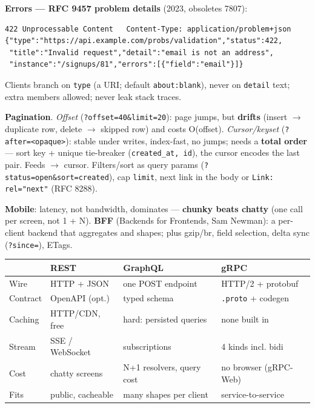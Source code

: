 \documentclass[8pt]{extarticle}
\begin{document}
\begin{multicols}{2}
\textbf{Errors — RFC 9457 problem details} (2023, obsoletes 7807):
\begin{lstlisting}
422 Unprocessable Content   Content-Type: application/problem+json
{"type":"https://api.example.com/probs/validation","status":422,
 "title":"Invalid request","detail":"email is not an address",
 "instance":"/signups/81","errors":[{"field":"email"}]}
\end{lstlisting}
Clients branch on \texttt{type} (a URI; default \texttt{about:blank}), never on
\texttt{detail} text; extra members allowed; never leak stack traces.

\textbf{Pagination}. \emph{Offset} (\texttt{?offset=40\&limit=20}): page jumps, but
\textbf{drifts} (insert $\to$ duplicate row, delete $\to$ skipped row) and costs O(offset).
\emph{Cursor/keyset} (\texttt{?after=<opaque>}): stable under writes, index-fast, no jumps;
needs a \textbf{total order} — sort key + unique tie-breaker (\texttt{created\_at, id}),
the cursor encodes the last pair. Feeds $\to$ cursor. Filters/sort as query params
(\texttt{?status=open\&sort=created}), cap \texttt{limit}, next link in the body or
\texttt{Link: rel="next"} (RFC 8288).

\textbf{Mobile}: latency, not bandwidth, dominates — \textbf{chunky beats chatty} (one call
per screen, not 1 + N). \textbf{BFF} (Backends for Frontends, Sam Newman): a per-client
backend that aggregates and shapes; plus gzip/br, field selection, delta sync
(\texttt{?since=}), ETags.

{\footnotesize\setlength\tabcolsep{3pt}
\begin{tabular}{@{}L{11mm}L{20mm}L{24mm}L{21mm}@{}}
\toprule
 & \textbf{REST} & \textbf{GraphQL} & \textbf{gRPC} \\
\midrule
Wire & HTTP + JSON & one POST endpoint & HTTP/2 + protobuf \\
Contract & OpenAPI (opt.) & typed schema & \texttt{.proto} + codegen \\
Caching & HTTP/CDN, free & hard: persisted queries & none built in \\
Stream & SSE / WebSocket & subscriptions & 4 kinds incl. bidi \\
Cost & chatty screens & N+1 resolvers, query cost & no browser (gRPC-Web) \\
Fits & public, cacheable & many shapes per client & service-to-service \\
\bottomrule
\end{tabular}}

\columnbreak


\end{multicols}
\end{document}
